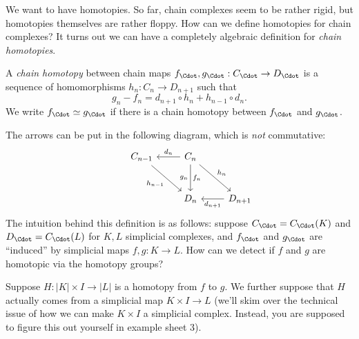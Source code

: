 \documentclass[a4paper]{article}
\begin{document}
We want to have homotopies. So far, chain complexes seem to be rather rigid, but homotopies themselves are rather floppy. How can we define homotopies for chain complexes? It turns out we can have a completely algebraic definition for \emph{chain homotopies}.

\begin{defi}
  A \emph{chain homotopy} between chain maps $f_{\Cdot}, g_{\Cdot}: C_{\Cdot} \to D_{\Cdot}$ is a sequence of homomorphisms $h_n: C_n \to D_{n + 1}$ such that
  \[
    g_n - f_n = d_{n + 1} \circ h_n + h_{n - 1} \circ d_n.
  \]
  We write $f_{\Cdot} \simeq g_{\Cdot}$ if there is a chain homotopy between $f_{\Cdot}$ and $g_{\Cdot}$.
\end{defi}
The arrows can be put in the following diagram, which is \emph{not} commutative:
\[
  \begin{tikzcd}[row sep=large]
    & C_{n - 1} \ar[rd, "h_{n - 1}"'] & C_n \ar [l, "d_n"'] \ar[d, "f_n", "g_n"'] \ar [rd, "h_n"]\\
    & & D_n & D_{n + 1} \ar [l, "d_{n + 1}"]
  \end{tikzcd}
\]
The intuition behind this definition is as follows: suppose $C_{\Cdot} = C_{\Cdot} (K)$ and $D_{\Cdot} = C_{\Cdot}(L)$ for $K, L$ simplicial complexes, and $f_{\Cdot}$ and $g_{\Cdot}$ are ``induced'' by simplicial maps $f, g: K \to L$. How can we detect if $f$ and $g$ are homotopic via the homotopy groups?

Suppose $H: |K| \times I \to |L|$ is a homotopy from $f$ to $g$. We further suppose that $H$ actually comes from a simplicial map $K \times I \to L$ (we'll skim over the technical issue of how we can make $K \times I$ a simplicial complex. Instead, you are supposed to figure this out yourself in example sheet 3).
\end{document}
